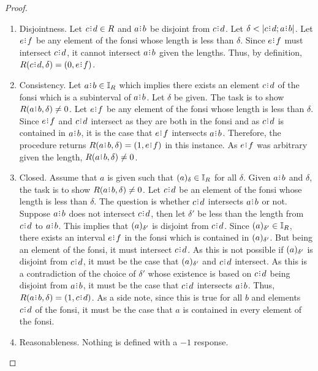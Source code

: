 \documentclass[12pt]{article}
\begin{document}
\begin{proof}
\begin{enumerate}
        \item Disjointness. Let $c\rint d \in R$ and $a\rint b$ be disjoint from $c\rint d$. Let $\delta < |c\rint d; a \rint b|$. Let $e\rint f$ be any element of the fonsi whose length is less than $\delta$. Since $e\rint f$ must intersect $c\rint d$, it cannot intersect $a\rint b$ given the lengths. Thus, by definition, $R(c\rint d, \delta) = (0, e \rint f)$. 
    
        \item Consistency. Let $a\rint b \in \mathbb{I}_R$ which implies there exists an element $c\rint d$ of the fonsi which is a subinterval of $a\rint b$. Let  $ \delta$ be given. The task is to show $R(a\rint b, \delta) \neq 0$. Let $e\rint f$ be any element of the fonsi whose length is less than $\delta$. Since $e\rint f$ and $c\rint d$ intersect as they are both in the fonsi and as $c\rint d$ is contained in $a\rint b$, it is the case that $e\rint f$ intersects $a\rint b$. Therefore, the procedure returns $R(a\rint b, \delta) = (1, e\rint f)$ in this instance. As $e\rint f$ was arbitrary given the length, $R(a\rint b, \delta) \neq 0$. 
        
        \item Closed. Assume that $a$ is given such that $\halo{a} \in \mathbb{I}_R$ for all $\delta$. Given $a\rint b$ and $\delta$, the task is to show $R(a\rint b, \delta) \neq 0$. Let $c\rint d$ be an element of the fonsi whose length is less than $\delta$. The question is whether $c\rint d$ intersects $a\rint b$ or not. Suppose $a\rint b$ does not intersect $c\rint d$, then let $\delta'$  be less than the length from $c\rint d$ to $a\rint b$. This implies that $\halo[\delta']{a}$ is disjoint from $c\rint d$. Since $\halo[\delta']{a} \in \mathbb{I}_R$, there exists an interval $e\rint f$ in the fonsi which is contained in $\halo[\delta']{a}$. But being an element of the fonsi, it must intersect $c\rint d$. As this is not possible if $\halo[\delta']{a}$ is disjoint from $c\rint d$, it must be the case that $\halo[\delta']{a}$ and $c\rint d$ intersect. As this is a contradiction of the choice of $\delta'$ whose existence is based on $c\rint d$ being disjoint from $a\rint b$, it must be the case that $c\rint d$ intersects $a\rint b$. Thus, $R(a\rint b, \delta) = (1, c \rint d)$. As a side note, since this is true for all $b$ and elements $c\rint d$ of the fonsi, it must be the case that $a$ is contained in every element of the fonsi. 

        \item Reasonableness. Nothing is defined with a $-1$ response. 
    \end{enumerate}

\end{proof}
\end{document}
